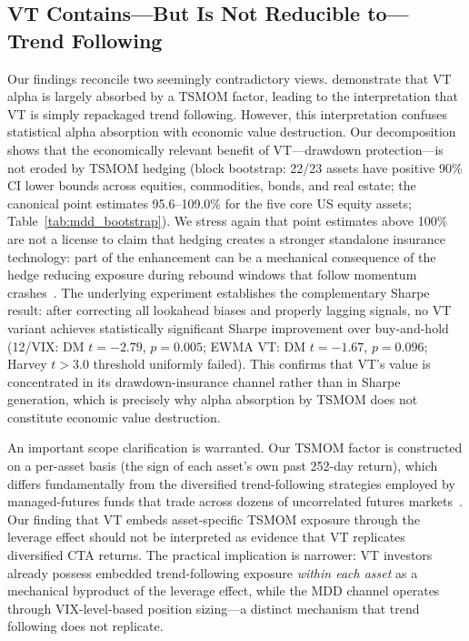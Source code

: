 \subsection{VT Contains---But Is Not Reducible to---Trend Following}

Our findings reconcile two seemingly contradictory views. \citet{hood2025} demonstrate that VT alpha is largely absorbed by a TSMOM factor, leading to the interpretation that VT is simply repackaged trend following. However, this interpretation confuses statistical alpha absorption with economic value destruction. Our decomposition shows that the economically relevant benefit of VT---drawdown protection---is not eroded by TSMOM hedging (block bootstrap: 22/23 assets have positive 90\% CI lower bounds across equities, commodities, bonds, and real estate; the canonical point estimates 95.6--109.0\% for the five core US equity assets; Table~\ref{tab:mdd_bootstrap}). We stress again that point estimates above 100\% are not a license to claim that hedging creates a stronger standalone insurance technology: part of the enhancement can be a mechanical consequence of the hedge reducing exposure during rebound windows that follow momentum crashes~\citep{daniel2016}. The underlying experiment establishes the complementary Sharpe result: after correcting all lookahead biases and properly lagging signals, no VT variant achieves statistically significant Sharpe improvement over buy-and-hold (12/VIX: DM $t = -2.79$, $p = 0.005$; EWMA VT: DM $t = -1.67$, $p = 0.096$; Harvey $t > 3.0$ threshold uniformly failed). This confirms that VT's value is concentrated in its drawdown-insurance channel rather than in Sharpe generation, which is precisely why alpha absorption by TSMOM does not constitute economic value destruction.

An important scope clarification is warranted. Our TSMOM factor is constructed on a per-asset basis (the sign of each asset's own past 252-day return), which differs fundamentally from the diversified trend-following strategies employed by managed-futures funds that trade across dozens of uncorrelated futures markets~\citep{moskowitz2012}. Our finding that VT embeds asset-specific TSMOM exposure through the leverage effect should not be interpreted as evidence that VT replicates diversified CTA returns. The practical implication is narrower: VT investors already possess embedded trend-following exposure \textit{within each asset} as a mechanical byproduct of the leverage effect, while the MDD channel operates through VIX-level-based position sizing---a distinct mechanism that trend following does not replicate.

